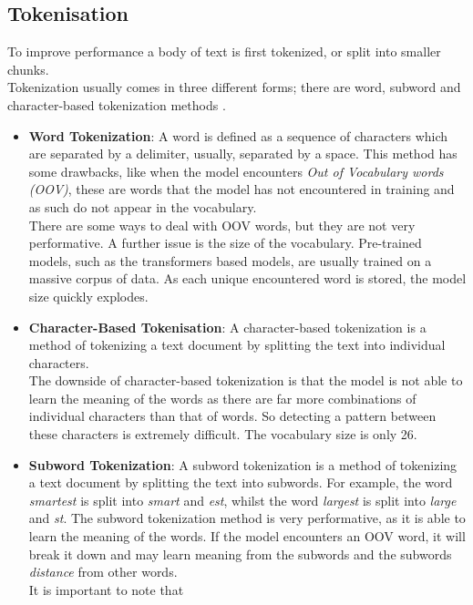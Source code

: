 \subsection{Tokenisation}
\label{sec:tokenisation}
To improve performance a body of text is first tokenized, or split into smaller chunks.\\
Tokenization usually comes in three different forms; there are word, subword and character-based tokenization methods \autocite{WhatTokenizationTokenization2020}.
\begin{itemize}
	\item \textbf{Word Tokenization}: A word is defined as a sequence of characters which are separated by a delimiter, usually, separated by a space.
	      This method has some drawbacks, like when the model encounters \emph{Out of Vocabulary words (OOV)}, these are words that the model has not encountered
	      in training and as such do not appear in the vocabulary.\\ There are some ways to deal with OOV words, but they are not very performative.
	      \bigbreak
	      A further issue is the size of the vocabulary. Pre-trained models, such as the transformers based models, are usually trained on a massive corpus of
	      data. As each unique encountered word is stored, the model size quickly explodes.
	\item \textbf{Character-Based Tokenisation}: A character-based tokenization is a method of tokenizing a text document by splitting the text into
	      individual characters. \\
	      The downside of character-based tokenization is that the model is not able to learn the meaning of the words as there are far more combinations of
	      individual characters than that of words. So detecting a pattern between these characters is extremely difficult. The vocabulary size is only
	      26.
	\item \textbf{Subword Tokenization}: A subword tokenization is a method of tokenizing a text document by splitting the text into subwords.
	      For example, the word \emph{smartest} is split into \emph{smart} and \emph{est}, whilst the word \emph{largest} is split into \emph{large} and \emph{st}.
	      The subword tokenization method is very performative, as it is able to learn the meaning of the words. If the model encounters an OOV word, it
	      will break it down and may learn meaning from the subwords and the subwords \emph{distance} from other words.\\ It is important to note that

\end{itemize}
